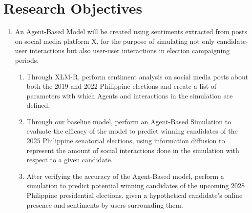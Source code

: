 \section{Research Objectives}
\begin{enumerate}
    \item An Agent-Based Model will be created using sentiments extracted from posts on social media platform X, for the purpose of simulating not only candidate-user interactions but also user-user interactions in election campaigning periods. 
    \begin{enumerate}
        \item Through XLM-R, perform sentiment analysis on social media posts about both the 2019 and 2022 Philippine elections and create a list of parameters with which Agents and interactions in the simulation are defined.
        \item Through our baseline model, perform an Agent-Based Simulation to evaluate the efficacy of the model to predict winning candidates of the 2025 Philippine senatorial elections, using information diffusion to represent the amount of social interactions done in the simulation with respect to a given candidate.
        \item After verifying the accuracy of the Agent-Based model, perform a simulation to predict potential winning candidates of the upcoming 2028 Philippine presidential elections, given a hypothetical candidate’s online presence and sentiments by users surrounding them.
    \end{enumerate}
\end{enumerate}
